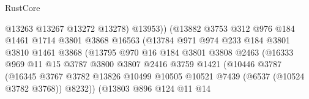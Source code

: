 \begin{lexlean}{RustCore}
\begin{coremodule}
                                      @13263
                                      @13267
                                      @13272
                                      @13278)
                                    @13953))
                                (@13882
                                  @3753
                                  @312
                                  @976
                                  @184
                                  @1461
                                  @1714
                                  @3801
                                  @3868
                                  @16563
                                  (@13784
                                    @971
                                    @974
                                    @233
                                    @184
                                    @3801
                                    @3810
                                    @1461
                                    @3868
                                    (@13795
                                      @970
                                      @16
                                      @184
                                      @3801
                                      @3808
                                      @2463
                                      (@16333
                                        @969
                                        @11
                                        @15
                                        @3787
                                        @3800
                                        @3807
                                        @2416
                                        @3759
                                        @1421
                                        (@10446
                                          @3787
                                          (@16345
                                            @3767
                                            @3782
                                            @13826
                                            @10499
                                            @10505
                                            @10521
                                            @7439
                                            (@6537 (@10524 @3782 @3768))
                                            @8232))
                                        (@13803
                                          @896
                                          @124
                                          @11
                                          @14

\end{coremodule}
\end{lexlean}
